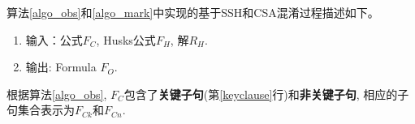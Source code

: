 %
%
%
%

算法\ref{algo_obs}和\ref{algo_mark}中实现的基于SSH和CSA混淆过程描述如下。
\begin{enumerate}
\item[]\label{obsprocedure} 输入：公式$F_C$, Husks公式$F_H$, 解$R_H$.
\item[] 输出: Formula $F_O$.
\end{enumerate}
根据算法\ref{algo_obs},
$F_C$包含了\textbf{关键子句}(第\ref{keyclause}行)和\textbf{非关键子句},
相应的子句集合表示为\textbf{$F_{Ck}$}和\textbf{$F_{Cn}$}.

